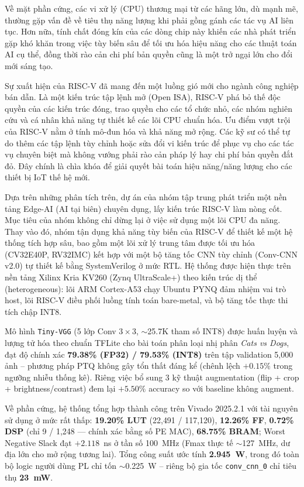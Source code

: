 Về mặt phần cứng, các vi xử lý (CPU) thương mại từ các hãng lớn, dù mạnh mẽ, thường gặp vấn đề về tiêu thụ năng lượng khi phải gồng gánh các tác vụ AI liên tục. Hơn nữa, tính chất đóng kín của các dòng chip này khiến các nhà phát triển gặp khó khăn trong việc tùy biến sâu để tối ưu hóa hiệu năng cho các thuật toán AI cụ thể, đồng thời rào cản chi phí bản quyền cũng là một trở ngại lớn cho đổi mới sáng tạo.

Sự xuất hiện của RISC-V đã mang đến một luồng gió mới cho ngành công nghiệp bán dẫn. Là một kiến trúc tập lệnh mở (Open ISA), RISC-V phá bỏ thế độc quyền của các kiến trúc đóng, trao quyền cho các tổ chức nhỏ, các nhóm nghiên cứu và cá nhân khả năng tự thiết kế các lõi CPU chuẩn hóa. Ưu điểm vượt trội của RISC-V nằm ở tính mô-đun hóa và khả năng mở rộng. Các kỹ sư có thể tự do thêm các tập lệnh tùy chỉnh hoặc sửa đổi vi kiến trúc để phục vụ cho các tác vụ chuyên biệt mà không vướng phải rào cản pháp lý hay chi phí bản quyền đắt đỏ. Đây chính là chìa khóa để giải quyết bài toán hiệu năng/năng lượng cho các thiết bị IoT thế hệ mới.

Dựa trên những phân tích trên, dự án của nhóm tập trung phát triển một nền tảng Edge-AI (AI tại biên) chuyên dụng, lấy kiến trúc RISC-V làm nòng cốt. Mục tiêu của nhóm không chỉ dừng lại ở việc sử dụng một lõi CPU đa năng. Thay vào đó, nhóm tận dụng khả năng tùy biến của RISC-V để thiết kế một hệ thống tích hợp sâu, bao gồm một lõi xử lý trung tâm được tối ưu hóa (CV32E40P, RV32IMC) kết hợp với một bộ tăng tốc CNN tùy chỉnh (Conv-CNN v2.0) tự thiết kế bằng SystemVerilog ở mức RTL. Hệ thống được hiện thực trên nền tảng Xilinx Kria KV260 (Zynq UltraScale+) theo kiến trúc dị thể (heterogeneous): lõi ARM Cortex-A53 chạy Ubuntu PYNQ đảm nhiệm vai trò host, lõi RISC-V điều phối luồng tính toán bare-metal, và bộ tăng tốc thực thi tích chập INT8.

Mô hình \texttt{Tiny-VGG} (5 lớp Conv $3\times3$, $\sim$25.7K tham số INT8) được huấn luyện và lượng tử hóa theo chuẩn TFLite cho bài toán phân loại nhị phân \textit{Cats vs Dogs}, đạt độ chính xác \textbf{79.38\% (FP32) / 79.53\% (INT8)} trên tập validation 5{,}000 ảnh -- phương pháp PTQ không gây tổn thất đáng kể (chênh lệch $+0.15\%$ trong ngưỡng nhiễu thống kê). Riêng việc bổ sung 3 kỹ thuật augmentation (flip + crop + brightness/contrast) đem lại $+5.50\%$ accuracy so với baseline không augment.

Về phần cứng, hệ thống tổng hợp thành công trên Vivado 2025.2.1 với tài nguyên sử dụng ở mức rất thấp: \textbf{19.20\% LUT} (22{,}491 / 117{,}120), \textbf{12.26\% FF}, \textbf{0.72\% DSP} (chỉ 9 / 1{,}248 — chính xác bằng số PE MAC), \textbf{68.75\% BRAM}; Worst Negative Slack đạt $+2.118$~ns ở tần số 100~MHz (Fmax thực tế $\sim$127~MHz, dư địa lớn cho mở rộng tương lai). Tổng công suất ước tính \textbf{2.945~W}, trong đó toàn bộ logic người dùng PL chỉ tốn $\sim$0.225~W -- riêng bộ gia tốc \texttt{conv\_cnn\_0} chỉ tiêu thụ \textbf{23~mW}.

